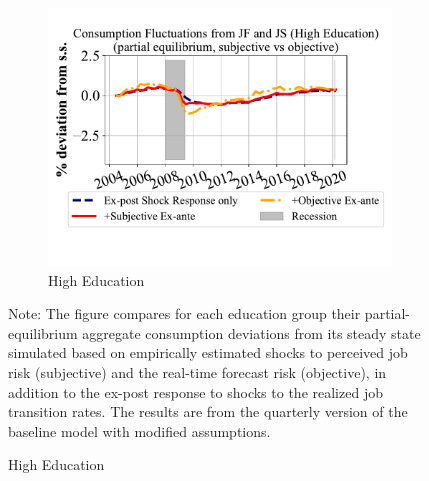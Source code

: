 \begin{figure}[ht]
\begin{subfigure}{0.32\linewidth}
    \end{subfigure}
    \hfill
    \begin{subfigure}{0.32\linewidth}
      \caption*{High Education}
        \includegraphics[width=\linewidth]{text/chapter2/Figures/consumption_pe_JS_JF_deviation_machine_as_rational_HighEdu.pdf}
      
    \end{subfigure}

    \begin{flushleft}
        \footnotesize 
        Note: The figure compares for each education group their partial-equilibrium aggregate consumption deviations from its steady state simulated based on empirically estimated shocks to perceived job risk (subjective) and the real-time forecast risk (objective), in addition to the ex-post response to shocks to the realized job transition rates. The results are from the quarterly version of the baseline model with modified assumptions.
    \end{flushleft}
\end{figure}








